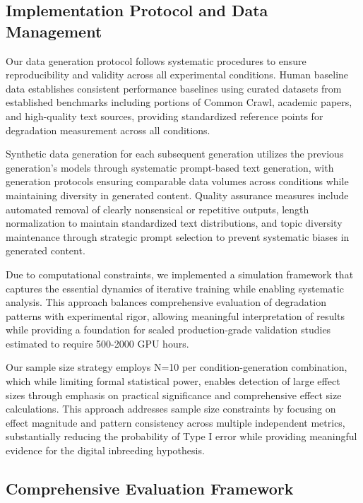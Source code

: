 \documentclass{article}
\begin{document}
\subsection{Implementation Protocol and Data Management}

Our data generation protocol follows systematic procedures to ensure reproducibility and validity across all experimental conditions. Human baseline data establishes consistent performance baselines using curated datasets from established benchmarks including portions of Common Crawl, academic papers, and high-quality text sources, providing standardized reference points for degradation measurement across all conditions.

Synthetic data generation for each subsequent generation utilizes the previous generation's models through systematic prompt-based text generation, with generation protocols ensuring comparable data volumes across conditions while maintaining diversity in generated content. Quality assurance measures include automated removal of clearly nonsensical or repetitive outputs, length normalization to maintain standardized text distributions, and topic diversity maintenance through strategic prompt selection to prevent systematic biases in generated content.

Due to computational constraints, we implemented a simulation framework that captures the essential dynamics of iterative training while enabling systematic analysis. This approach balances comprehensive evaluation of degradation patterns with experimental rigor, allowing meaningful interpretation of results while providing a foundation for scaled production-grade validation studies estimated to require 500-2000 GPU hours.

Our sample size strategy employs N=10 per condition-generation combination, which while limiting formal statistical power, enables detection of large effect sizes through emphasis on practical significance and comprehensive effect size calculations. This approach addresses sample size constraints by focusing on effect magnitude and pattern consistency across multiple independent metrics, substantially reducing the probability of Type I error while providing meaningful evidence for the digital inbreeding hypothesis.

\subsection{Comprehensive Evaluation Framework}
\end{document}
